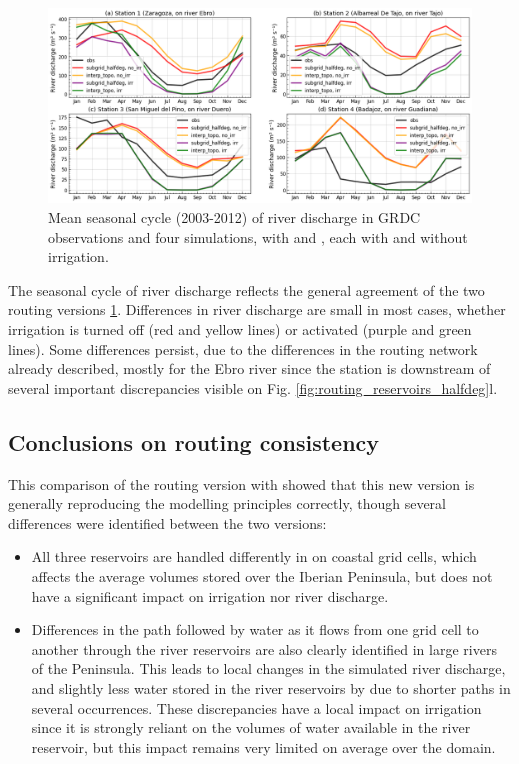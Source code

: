 \begin{figure}[htbp]
    \centering
    \includegraphics[width=\textwidth]{images/chap3/river_discharge/halfdeg_4stations_SC.png}
    \caption{Mean seasonal cycle (2003-2012) of river discharge in GRDC observations and four simulations, with \native and \std, each with and without irrigation.}
    \label{fig:halfdeg_stations_SC}
\end{figure}

The seasonal cycle of river discharge reflects the general agreement of the two routing versions \ref{fig:halfdeg_stations_SC}. Differences in river discharge are small in most cases, whether irrigation is turned off (red and yellow lines) or activated (purple and green lines). Some differences persist, due to the differences in the routing network already described, mostly for the Ebro river since the station is downstream of several important discrepancies visible on Fig. \ref{fig:routing_reservoirs_halfdeg}l.

\subsection{Conclusions on \native routing consistency}
This comparison of the \native routing version with \std showed that this new version is generally reproducing the modelling principles correctly, though several differences were identified between the two versions:
\begin{itemize}
    \item All three reservoirs are handled differently in \native on coastal grid cells, which affects the average volumes stored over the Iberian Peninsula, but does not have a significant impact on irrigation nor river discharge. 
    \item Differences in the path followed by water as it flows from one grid cell to another through the river reservoirs are also clearly identified in large rivers of the Peninsula. This leads to local changes in the simulated river discharge, and slightly less water stored in the river reservoirs by \native due to shorter paths in several occurrences. These discrepancies have a local impact on irrigation since it is strongly reliant on the volumes of water available in the river reservoir, but this impact remains very limited on average over the domain.
\end{itemize}

